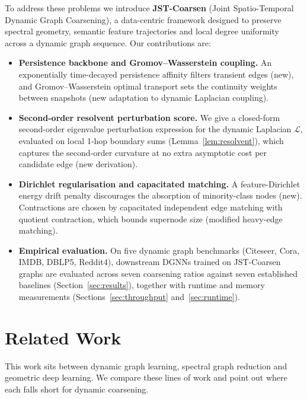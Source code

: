 \documentclass[sigconf]{acmart}
\begin{document}
To address these problems we introduce \textbf{JST-Coarsen} (Joint Spatio-Temporal Dynamic Graph Coarsening), a data-centric framework designed to preserve spectral geometry, semantic feature trajectories and local degree uniformity across a dynamic graph sequence. Our contributions are:
\begin{itemize}
    \item \textbf{Persistence backbone and Gromov--Wasserstein coupling.} An exponentially time-decayed persistence affinity filters transient edges (new), and Gromov--Wasserstein optimal transport sets the continuity weights between snapshots (new adaptation to dynamic Laplacian coupling).
    \item \textbf{Second-order resolvent perturbation score.} We give a closed-form second-order eigenvalue perturbation expression for the dynamic Laplacian $\mathcal{L}$, evaluated on local 1-hop boundary sums (Lemma~\ref{lem:resolvent}), which captures the second-order curvature at no extra asymptotic cost per candidate edge (new derivation).
    \item \textbf{Dirichlet regularisation and capacitated matching.} A feature-Dirichlet energy drift penalty discourages the absorption of minority-class nodes (new). Contractions are chosen by capacitated independent edge matching with quotient contraction, which bounds supernode size (modified heavy-edge matching).
    \item \textbf{Empirical evaluation.} On five dynamic graph benchmarks (Citeseer, Cora, IMDB, DBLP5, Reddit4), downstream DGNNs trained on JST-Coarsen graphs are evaluated across seven coarsening ratios against seven established baselines (Section~\ref{sec:results}), together with runtime and memory measurements (Sections~\ref{sec:throughput} and~\ref{sec:runtime}).
\end{itemize}

\section{Related Work}
\label{sec:related}
This work sits between dynamic graph learning, spectral graph reduction and geometric deep learning. We compare these lines of work and point out where each falls short for dynamic coarsening.
\end{document}
